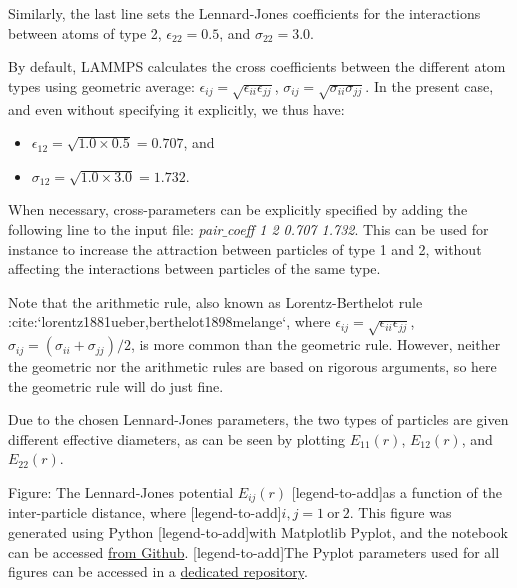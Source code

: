 \vspace{0.25cm} \noindent Similarly, the last line sets the Lennard-Jones coefficients for
the interactions between atoms of type 2, $\epsilon_{22} = 0.5$,
and $\sigma_{22} = 3.0$.

\begin{tcolorbox}[colback=mylightblue!5!white,colframe=mylightblue!75!black,title=About cross parameters]

\vspace{0.25cm} \noindent By default, LAMMPS calculates the cross coefficients between the different atom types
using geometric average: 
$\epsilon_{ij} = \sqrt{\epsilon_{ii} \epsilon_{jj}}$,
$\sigma_{ij} = \sqrt{\sigma_{ii} \sigma_{jj}}$. 
In the present case, and even without specifying it explicitly, we thus have:

\begin{itemize}
\item $\epsilon_{12} = \sqrt{1.0 \times 0.5} = 0.707$, and 
\item $\sigma_{12} = \sqrt{1.0 \times 3.0} = 1.732$.
\end{itemize}

\vspace{0.25cm} \noindent When necessary, cross-parameters can be explicitly specified
by adding the following line to the input file: \textit{pair$\_$coeff 1 2 0.707 1.732}. 
This can be used for instance to increase the attraction between particles
of type 1 and 2, without affecting the interactions between particles of the same type.

\vspace{0.25cm} \noindent Note that the arithmetic rule, also known as 
Lorentz-Berthelot rule :cite:`lorentz1881ueber,berthelot1898melange`, where 
$\epsilon_{ij} = \sqrt{\epsilon_{ii} \epsilon_{jj}}$,
$\sigma_{ij} = (\sigma_{ii}+\sigma_{jj})/2$, 
is more common than the geometric rule. However, neither the geometric nor the
arithmetic rules are based on rigorous arguments, so here
the geometric rule will do just fine. 
\end{tcolorbox}

\noindent Due to the chosen Lennard-Jones parameters, the two types of particles
are given different effective diameters, as can be seen by plotting
$E_{11} (r)$, 
$E_{12} (r)$,
and $E_{22} (r)$.

\vspace{0.25cm} Figure: The Lennard-Jones potential $E_{ij} (r)$
[legend-to-add]as a function of the inter-particle distance, where
[legend-to-add]$i, j = 1 ~ \text{or} ~ 2$. This figure was generated using Python
[legend-to-add]with Matplotlib Pyplot, and the notebook can be accessed \href{https://github.com/lammpstutorials/lammpstutorials.github.io/blob/version2.0/docs/sphinx/source/tutorials/figures/level1/lennard-jones-fluid/lennard-jones-pyplot.ipynb}{from Github}.
[legend-to-add]The Pyplot parameters used for all figures can be accessed in a \href{https://github.com/simongravelle/pyplot-perso}{dedicated repository}.

